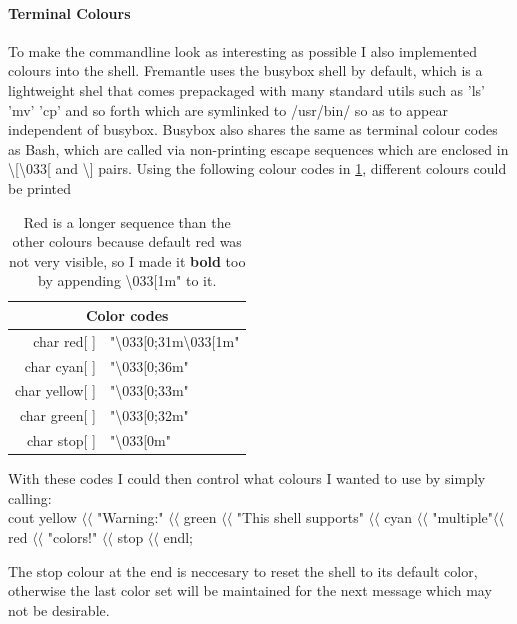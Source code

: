 \documentclass[11pt]{article} %
\begin{document}
\paragraph{Terminal Colours\\}{
To make the commandline look as interesting as possible I also implemented colours into the shell. Fremantle uses the busybox shell by default, which is a lightweight shel that comes prepackaged with many standard utils such as 'ls' 'mv' 'cp' and so forth which are symlinked to /usr/bin/ so as to appear independent of busybox.
Busybox also shares the same as terminal colour codes as Bash, which are called via non-printing escape sequences which are enclosed in \textbackslash[\textbackslash033[ and \textbackslash] pairs.
Using the following colour codes in \cref{tab:colorcodes}, different colours could be printed

\begin{table}[H]
\centering
\begin{tabular}{| r | l |}
\hline
\multicolumn{2}{|c|}{\bf Color codes} \\
\hline
char red[ ] &"\textbackslash033[0;31m\textbackslash033[1m"\\
char cyan[ ] &"\textbackslash033[0;36m"\\
char yellow[ ] &"\textbackslash033[0;33m"\\
char green[ ] &"\textbackslash033[0;32m"\\
char stop[ ] &"\textbackslash033[0m"\\
\hline
\end{tabular}
\caption{Red is a longer sequence than the other colours because default red was not very visible, so I made it {\bf bold} too by appending \textbackslash033[1m" to it.}
\label{tab:colorcodes}
\end{table}

With these codes I could then control what colours I wanted to use by simply calling:\\
cout  yellow \(\langle\langle\) "Warning:" \(\langle\langle\) green \(\langle\langle\) "This shell supports" \(\langle\langle\) cyan \(\langle\langle\) "multiple"\(\langle\langle\)  red \(\langle\langle\) "colors!" \(\langle\langle\) stop \(\langle\langle\) endl;

The stop colour at the end is neccesary to reset the shell to its default color, otherwise the last color set will be maintained for the next message which may not be desirable.

}
\end{document}
